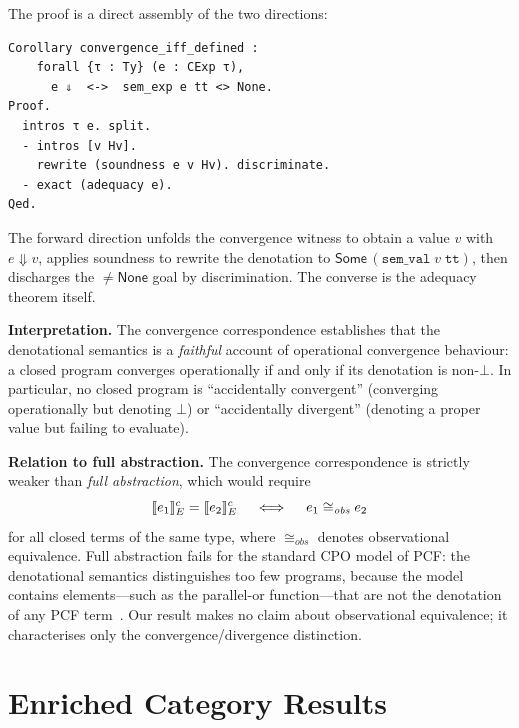 \noindent
The \Rocq{} proof is a direct assembly of the two directions:

\begin{lstlisting}[caption={Convergence correspondence
  (\texttt{PCF\_Adequacy.v}).},
                    label={lst:convergence}]
Corollary convergence_iff_defined :
    forall {τ : Ty} (e : CExp τ),
      e ⇓  <->  sem_exp e tt <> None.
Proof.
  intros τ e. split.
  - intros [v Hv].
    rewrite (soundness e v Hv). discriminate.
  - exact (adequacy e).
Qed.
\end{lstlisting}

\noindent
The forward direction unfolds the convergence witness to obtain a value
$v$ with $e \Downarrow v$, applies soundness to rewrite the denotation
to $\mathsf{Some}\,(\texttt{sem\_val}\;v\;\mathtt{tt})$, then
discharges the $\neq \mathsf{None}$ goal by discrimination.  The
converse is the adequacy theorem itself.

\medskip

\noindent
\textbf{Interpretation.}\;
The convergence correspondence establishes that the denotational
semantics is a \emph{faithful} account of operational convergence
behaviour: a closed program converges operationally if and only if its
denotation is non-$\bot$.  In particular, no closed program is
``accidentally convergent'' (converging operationally but denoting
$\bot$) or ``accidentally divergent'' (denoting a proper value but
failing to evaluate).

\medskip

\noindent
\textbf{Relation to full abstraction.}\;
The convergence correspondence is strictly weaker than \emph{full
abstraction}, which would require
\[
  \llbracket e_1 \rrbracket^c_E = \llbracket e_2 \rrbracket^c_E
  \quad\iff\quad
  e_1 \cong_{\mathit{obs}} e_2
\]
for all closed terms of the same type, where $\cong_{\mathit{obs}}$
denotes observational equivalence.  Full abstraction fails for the
standard CPO model of PCF: the denotational semantics distinguishes
too few programs, because the model contains elements---such as the
parallel-or function---that are not the denotation of any PCF
term~\cite{Plotkin1977}.  Our result makes no claim about
observational equivalence; it characterises only the
convergence/divergence distinction.

\section{Enriched Category Results}
\label{sec:res-enriched}

